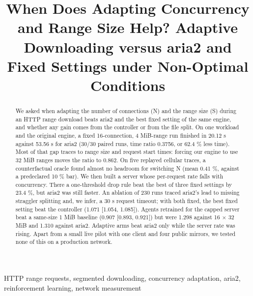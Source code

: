 \documentclass[conference]{IEEEtran}
\begin{document}
\title{When Does Adapting Concurrency and Range Size Help? Adaptive Downloading versus aria2 and Fixed Settings under Non-Optimal Conditions}
\author{
\and
{}
\and
{}
}
\maketitle

\begin{abstract}We asked when adapting the number of connections (N) and the range size (S) during an HTTP range download beats aria2 and the best fixed setting of the same engine, and whether any gain comes from the controller or from the file split. On one workload and the original engine, a fixed 16-connection, 4 MiB-range run finished in 20.12 s against 53.56 s for aria2 (30/30 paired runs, time ratio 0.3756, or 62.4 \% less time). Most of that gap traces to range size and request start times: forcing our engine to use 32 MiB ranges moves the ratio to 0.862. On five replayed cellular traces, a counterfactual oracle found almost no headroom for switching N (mean 0.41 \%, against a predeclared 10 \% bar). We then built a server whose per-request rate falls with concurrency. There a one-threshold drop rule beat the best of three fixed settings by 23.4 \%, but aria2 was still faster. An ablation of 230 runs traced aria2's lead to missing straggler splitting and, we infer, a 30 s request timeout; with both fixed, the best fixed setting beat the controller (1.071 [1.054, 1.085]). Agents retrained for the capped server beat a same-size 1 MiB baseline (0.907 [0.893, 0.921]) but were 1.298 against 16 × 32 MiB and 1.310 against aria2. Adaptive arms beat aria2 only while the server rate was rising. Apart from a small live pilot with one client and four public mirrors, we tested none of this on a production network.\end{abstract}
\begin{IEEEkeywords}HTTP range requests, segmented downloading, concurrency adaptation, aria2, reinforcement learning, network measurement\end{IEEEkeywords}
\end{document}
